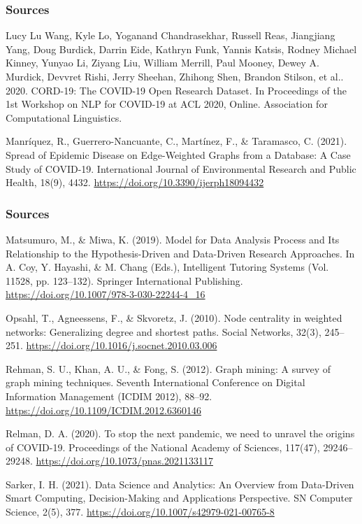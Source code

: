 \documentclass{beamer}
\begin{document}
\begin{frame}
\frametitle{Sources}

Lucy Lu Wang, Kyle Lo, Yoganand Chandrasekhar, Russell Reas, Jiangjiang Yang, Doug Burdick, Darrin Eide, Kathryn Funk, Yannis Katsis, Rodney Michael Kinney, Yunyao Li, Ziyang Liu, William Merrill, Paul Mooney, Dewey A. Murdick, Devvret Rishi, Jerry Sheehan, Zhihong Shen, Brandon Stilson, et al.. 2020. CORD-19: The COVID-19 Open Research Dataset. In Proceedings of the 1st Workshop on NLP for COVID-19 at ACL 2020, Online. Association for Computational Linguistics.

\vspace{5px}

Manríquez, R., Guerrero-Nancuante, C., Martínez, F., \& Taramasco, C. (2021). Spread of Epidemic Disease on Edge-Weighted Graphs from a Database: A Case Study of COVID-19. International Journal of Environmental Research and Public Health, 18(9), 4432. \url{https://doi.org/10.3390/ijerph18094432}

\vspace{5px}

\end{frame}


\begin{frame}
\frametitle{Sources}

Matsumuro, M., \& Miwa, K. (2019). Model for Data Analysis Process and Its Relationship to the Hypothesis-Driven and Data-Driven Research Approaches. In A. Coy, Y. Hayashi, \& M. Chang (Eds.), Intelligent Tutoring Systems (Vol. 11528, pp. 123–132). Springer International Publishing. \url{https://doi.org/10.1007/978-3-030-22244-4_16}

\vspace{5px}

Opsahl, T., Agneessens, F., \& Skvoretz, J. (2010). Node centrality in weighted networks: Generalizing degree and shortest paths. Social Networks, 32(3), 245–251. \url{https://doi.org/10.1016/j.socnet.2010.03.006}

\vspace{5px}

Rehman, S. U., Khan, A. U., \& Fong, S. (2012). Graph mining: A survey of graph mining techniques. Seventh International Conference on Digital Information Management (ICDIM 2012), 88–92. \url{https://doi.org/10.1109/ICDIM.2012.6360146}

\vspace{5px}

Relman, D. A. (2020). To stop the next pandemic, we need to unravel the origins of COVID-19. Proceedings of the National Academy of Sciences, 117(47), 29246–29248. \url{https://doi.org/10.1073/pnas.2021133117}

\vspace{5px}

Sarker, I. H. (2021). Data Science and Analytics: An Overview from Data-Driven Smart Computing, Decision-Making and Applications Perspective. SN Computer Science, 2(5), 377. \url{https://doi.org/10.1007/s42979-021-00765-8}

\end{frame}
\end{document}

